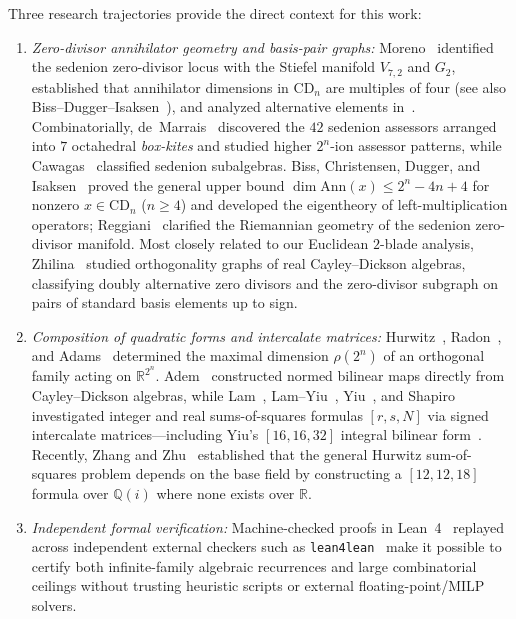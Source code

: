 \documentclass[11pt,reqno]{amsart}
\theoremstyle{plain}
\theoremstyle{definition}
\theoremstyle{remark}
\newcommand{\CD}{\mathrm{CD}}
\newcommand{\R}{\mathbb{R}}
\newcommand{\Q}{\mathbb{Q}}
\newcommand{\Ann}{\mathrm{Ann}}
\begin{document}
Three research trajectories provide the direct context for this work:
\begin{enumerate}[leftmargin=2em]
  \item \emph{Zero-divisor annihilator geometry and basis-pair graphs:}
    Moreno~\cite{moreno1998} identified the sedenion zero-divisor locus with the Stiefel manifold
    $V_{7,2}$ and $G_2$, established that annihilator dimensions in $\CD_n$ are multiples of
    four (see also Biss--Dugger--Isaksen~\cite{biss2008i}), and analyzed alternative elements
    in~\cite{moreno2004}. Combinatorially, de~Marrais~\cite{demarrais2000,demarrais2002}
    discovered the $42$ sedenion assessors arranged into $7$ octahedral \emph{box-kites} and
    studied higher $2^n$-ion assessor patterns, while Cawagas~\cite{cawagas2004} classified
    sedenion subalgebras. Biss, Christensen, Dugger, and
    Isaksen~\cite{biss2008i,biss2007ii,biss2009eigen} proved the general upper bound
    $\dim \Ann(x) \le 2^n - 4n + 4$ for nonzero $x \in \CD_n$ ($n \ge 4$) and developed the
    eigentheory of left-multiplication operators; Reggiani~\cite{reggiani2024sedenions}
    clarified the Riemannian geometry of the sedenion zero-divisor manifold. Most closely
    related to our Euclidean $2$-blade analysis, Zhilina~\cite{zhilina2021i,zhilina2021ii}
    studied orthogonality graphs of real Cayley--Dickson algebras, classifying doubly alternative
    zero divisors and the zero-divisor subgraph on pairs of standard basis elements up to sign.
  \item \emph{Composition of quadratic forms and intercalate matrices:}
    Hurwitz~\cite{hurwitz1922}, Radon~\cite{radon1922}, and Adams~\cite{adams1962} determined
    the maximal dimension $\rho(2^n)$ of an orthogonal family acting on $\R^{2^n}$.
    Adem~\cite{adem1975} constructed normed bilinear maps directly from Cayley--Dickson algebras,
    while Lam~\cite{lam1985}, Lam--Yiu~\cite{lamyiu1987}, Yiu~\cite{yiu1987,yiu1990,yiu1994},
    and Shapiro~\cite{shapiro2000} investigated integer and real sums-of-squares formulas
    $[r, s, N]$ via signed intercalate matrices---including Yiu's $[16, 16, 32]$ integral
    bilinear form~\cite{yiu1990}. Recently, Zhang and Zhu~\cite{zhangzhu2026hurwitz} established
    that the general Hurwitz sum-of-squares problem depends on the base field by constructing a
    $[12, 12, 18]$ formula over $\Q(i)$ where none exists over $\R$.
  \item \emph{Independent formal verification:}
    Machine-checked proofs in Lean~4~\cite{demoura2021lean4} replayed across independent external
    checkers such as \texttt{lean4lean}~\cite{carneiro2024lean4lean} make it possible to certify
    both infinite-family algebraic recurrences and large combinatorial ceilings without trusting
    heuristic scripts or external floating-point/MILP solvers.
\end{enumerate}
\end{document}
